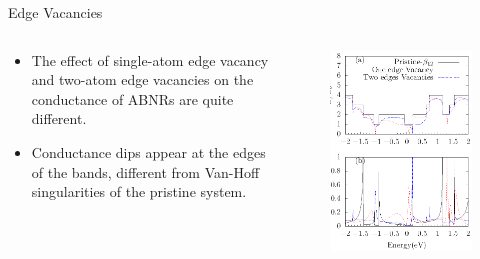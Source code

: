 \documentclass[handout,t]{beamer}
\begin{document}
\begin{frame}{Edge Vacancies}
	\begin{columns}[t]
		\begin{column}[t]{0.5\linewidth}
			\begin{itemize}
				\item The effect of single-atom edge vacancy and two-atom edge vacancies on the conductance of ABNRs are quite different.
				\item Conductance dips appear at the edges of the bands, different from Van-Hoff singularities of the pristine system.
			\end{itemize}
		\end{column}
		\begin{column}[t]{0.5\linewidth}
			\begin{figure}[ht]
				\raggedleft
				\includegraphics[width=\linewidth]{../figures/armvacancy-thesis.eps}
			\end{figure}
		\end{column}
	\end{columns}
\end{frame}
\end{document}
